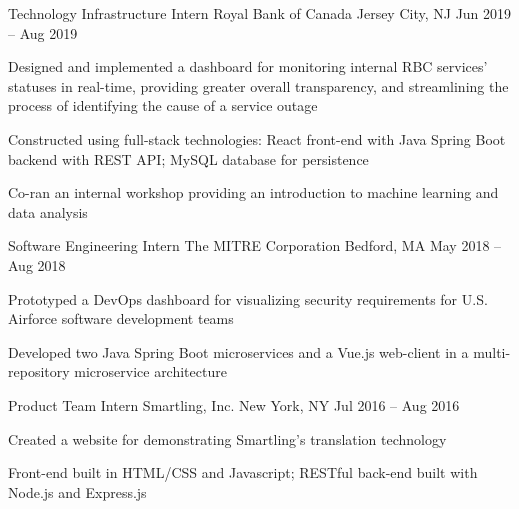 

\begin{cventries}

  \cventry
  {Technology Infrastructure Intern}
  {Royal Bank of Canada}
  {Jersey City, NJ}
  {Jun 2019 -- Aug 2019}
  {
    \begin{cvitems}
      \item {Designed and implemented a dashboard for monitoring internal RBC services' statuses in real-time, providing greater overall transparency, and streamlining the process of identifying the cause of a service outage}
      \item {Constructed using full-stack technologies: React front-end with Java Spring Boot backend with REST API; MySQL database for persistence}
      \item {Co-ran an internal workshop providing an introduction to machine learning and data analysis}
    \end{cvitems}
  }


  \cventry
  {Software Engineering Intern}
  {The MITRE Corporation}
  {Bedford, MA}
  {May 2018 -- Aug 2018}
  {
    \begin{cvitems}
      \item {Prototyped a DevOps dashboard for visualizing security requirements for U.S. Airforce software development teams}
      \item {Developed two Java Spring Boot microservices and a Vue.js web-client in a multi-repository microservice architecture}
    \end{cvitems}
  }


  \cventry
  {Product Team Intern}
  {Smartling, Inc.}
  {New York, NY}
  {Jul 2016 -- Aug 2016}
  {
    \begin{cvitems}
      \item Created a website for demonstrating Smartling's translation technology
      \item Front-end built in HTML/CSS and Javascript; RESTful back-end built with Node.js and Express.js
    \end{cvitems}
  }


\end{cventries}